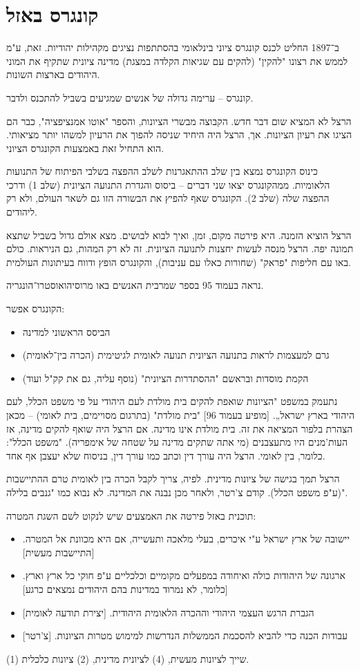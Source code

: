 \documentclass[]{article}
\begin{document}
	\section{קונגרס באזל}
	ב־1897 החליט לכנס קונגרס ציוני בינלאומי בהסתתפות נציגים מקהילות יהודיות. זאת, ע"מ לממש את רצונו "להקין" (להקים עם שגיאות הקלדה במצגת) מדינה ציונית שתקיף את המוני היהודים בארצות השונות. 
	
	קונגרס – ערימה גדולה של אנשים שמגיעים בשביל להתכנס ולדבר. 
	
	הרצל לא המציא שום דבר חדש. הקבוצה מבשרי הציונות, והספר "אוטו אמנציפציה", כבר הם הציגו את רעיון הציונות. אך, הרצל היה היחיד שניסה להפוך את הרעיון למשהו יותר מציאותי. הוא התחיל זאת באמצעות הקונגרס הציוני. 
	
	כינוס הקונגרס נמצא בין שלב ההתאגרנות לשלב ההפצה בשלבי הפיתוח של התנועות הלאומיות. ממהקונגרס יצאו שני דברים – ביסוס והגדרת התנועה הציונית (שלב 1) ודרכי ההפצה שלה (שלב 2). הקונגרס שאף להפיץ את הבשורה הזו גם לשאר העולם, ולא רק ליהודים. 
	
	הרצל הוציא הזמנה. היא פירטה מקום, זמן, ואיך לבוא לבושים. מצא אולם גדול בשביל שתצא תמונה יפה. הרצל מנסה לעשות יחצנות לתנועה הציונית. זה לא רק המהות, גם הניראות. כולם באו עם חליפות "פראק" (שחורות כאלו עם עניבות), והקונגרס הופץ ודווח בעיתונות העולמית. 
	
	נראה בעמוד 95 בספר שמרבית האנשים באו מרוסיהואוסטרו־הונגריה. 
	
	הקונגרס אפשר: 
	\begin{itemize}
		\item הביסס הראשוני למדינה
		\item גרם למעצמות לראות בתנועה הציונית תנועה לאומית לגיטימית (הכרה בין־לאומית)
		\item הקמת מוסדות ובראשם "ההסתדרות הציונית" (נוסף עליה, גם את קק"ל ועוד)
	\end{itemize}
	
	נתעמק במשפט "הציונות שואפת להקים בית מולדת לעם היהודי על פי משפט הכלל, לעם היהודי בארץ ישראל„. [מופיע בעמוד 96] "בית מולדת" (בתרגום מסויימים, בית לאומי) – מכאן הצהרת בלפור המציאה את זה. בית מולדת אינו מדינה. אם הרצל היה שואף להקים מדינה, אז העות'מנים היו מתעצבנים (מי אתה שתקים מדינה על שטחה של אימפריה). "משפט הכלל": כלומר, בין לאומי. הרצל היה עורך דין וכתב כמו עורך דין, בניסוח שלא יעצבן אף אחד. 
	
	הרצל תמך בגישה של ציונות מדינית. לפיה, צריך לקבל הכרה בין לאומית טרם ההתיישבות (ע"פ משפט הכלל). קודם צ'רטר, ולאחר מכן נבנה את המדינה. לא נבוא כמו "גנבים בלילה". 
	
	תוכנית באזל פירטה את האמצעים שיש לנקוט לשם השגת המטרה: 
	\begin{itemize}
		\item יישובה של ארץ ישראל ע"י איכרים, בעלי מלאכה ותעשייה, אם היא מכוונת אל המטרה. [התיישבות מעשית]
		\item ארגונה של היהודות כולה ואיחודה במפעלים מקומיים וכלכליים ע"פ חוקי כל ארץ וארץ. [כלומר, לא נמרוד במדינות בהם היהודים נמצאים כרגע]
		\item הגברת הרגש העצמי היהודי וההכרה הלאומית היהודית. [יצירת תודעה לאומית]
		\item עבודות הכנה כדי להביא להסכמת הממשלות הנדרשות למימוש מטרות הציונות. [צ'רטר]
	\end{itemize}
	(1) שייך לציונות מעשית, (4) לציונית מדינית, (2) ציונות כלכלית. 
	
\end{document}
